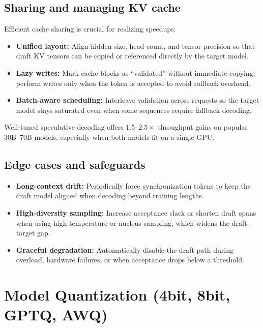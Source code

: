 \documentclass{article}
\begin{document}
\subsection{Sharing and managing KV cache}
Efficient cache sharing is crucial for realizing speedups:
\begin{itemize}
  \item \textbf{Unified layout:} Align hidden size, head count, and tensor precision so that draft KV tensors can be copied or referenced directly by the target model.
  \item \textbf{Lazy writes:} Mark cache blocks as ``validated'' without immediate copying; perform writes only when the token is accepted to avoid rollback overhead.
  \item \textbf{Batch-aware scheduling:} Interleave validation across requests so the target model stays saturated even when some sequences require fallback decoding.
\end{itemize}
Well-tuned speculative decoding offers $1.5$--$2.5\times$ throughput gains on popular 30B--70B models, especially when both models fit on a single GPU.

\subsection{Edge cases and safeguards}
\begin{itemize}
  \item \textbf{Long-context drift:} Periodically force synchronization tokens to keep the draft model aligned when decoding beyond training lengths.
  \item \textbf{High-diversity sampling:} Increase acceptance slack or shorten draft spans when using high temperature or nucleus sampling, which widens the draft-target gap.
  \item \textbf{Graceful degradation:} Automatically disable the draft path during overload, hardware failures, or when acceptance drops below a threshold.
\end{itemize}

\section{Model Quantization (4bit, 8bit, GPTQ, AWQ)}
\end{document}
